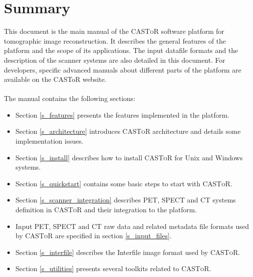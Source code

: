 \documentclass[a4paper, 11pt]{article}
\newcommand{\castor}{\textsc{CASToR}\xspace}
\begin{document}
\section*{Summary}

This document is the main manual of the \castor software platform for tomographic image reconstruction.
It describes the general features of the platform and the scope of its applications.
The input datafile formats and the description of the scanner systems are also detailed in this document.
For developers, specific advanced manuals about different parts of the platform are available on the CASToR website.\\
\\
The manual contains the following sections:
\begin{itemize}
  \item Section \ref{s_features} presents the features implemented in the platform. 
  \item Section \ref{s_architecture} introduces \castor architecture and details some implementation issues. 
  \item Section \ref{s_install} describes how to install \castor for Unix and Windows systems.
  \item Section \ref{s_quickstart} contains some basic steps to start with \castor. 
  \item Section \ref{s_scanner_integration} describes PET, SPECT and CT systems definition in \castor and their integration to the platform.
  \item Input PET, SPECT and CT raw data and related metadata file formats used by \castor are specified in section \ref{s_input_files}. 
  \item Section \ref{s_interfile} describes the Interfile image format used by \castor.
  \item Section \ref{s_utilities} presents several toolkits related to \castor.
\end{itemize}


\newpage
\end{document}
